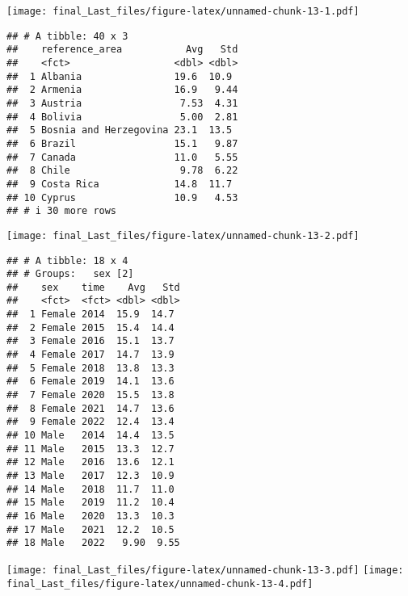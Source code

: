 \documentclass[
]{article}
\begin{document}
\texttt{[image: final\_Last\_files/figure-latex/unnamed-chunk-13-1.pdf]}

\begin{verbatim}
## # A tibble: 40 x 3
##    reference_area           Avg   Std
##    <fct>                  <dbl> <dbl>
##  1 Albania                19.6  10.9 
##  2 Armenia                16.9   9.44
##  3 Austria                 7.53  4.31
##  4 Bolivia                 5.00  2.81
##  5 Bosnia and Herzegovina 23.1  13.5 
##  6 Brazil                 15.1   9.87
##  7 Canada                 11.0   5.55
##  8 Chile                   9.78  6.22
##  9 Costa Rica             14.8  11.7 
## 10 Cyprus                 10.9   4.53
## # i 30 more rows
\end{verbatim}

\texttt{[image: final\_Last\_files/figure-latex/unnamed-chunk-13-2.pdf]}

\begin{verbatim}
## # A tibble: 18 x 4
## # Groups:   sex [2]
##    sex    time    Avg   Std
##    <fct>  <fct> <dbl> <dbl>
##  1 Female 2014  15.9  14.7 
##  2 Female 2015  15.4  14.4 
##  3 Female 2016  15.1  13.7 
##  4 Female 2017  14.7  13.9 
##  5 Female 2018  13.8  13.3 
##  6 Female 2019  14.1  13.6 
##  7 Female 2020  15.5  13.8 
##  8 Female 2021  14.7  13.6 
##  9 Female 2022  12.4  13.4 
## 10 Male   2014  14.4  13.5 
## 11 Male   2015  13.3  12.7 
## 12 Male   2016  13.6  12.1 
## 13 Male   2017  12.3  10.9 
## 14 Male   2018  11.7  11.0 
## 15 Male   2019  11.2  10.4 
## 16 Male   2020  13.3  10.3 
## 17 Male   2021  12.2  10.5 
## 18 Male   2022   9.90  9.55
\end{verbatim}

\texttt{[image: final\_Last\_files/figure-latex/unnamed-chunk-13-3.pdf]}
\texttt{[image: final\_Last\_files/figure-latex/unnamed-chunk-13-4.pdf]}
\end{document}
